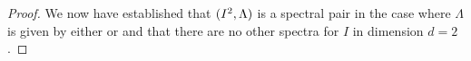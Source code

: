 \documentclass[../thesis.tex]{subfiles}
\begin{document}
\begin{proof}
    We now have established that $(I^2, \Lambda)$ is a spectral pair in the case where $\Lambda$ is given by either  or  and that there are no other spectra for $I$ in dimension $d=2$. 



\end{proof}
\end{document}
